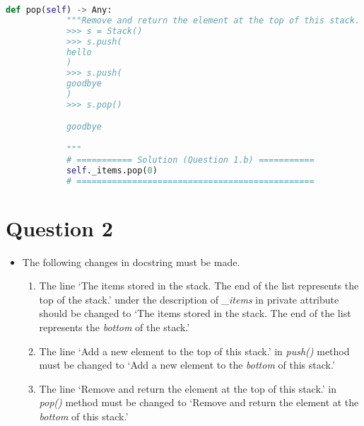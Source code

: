\documentclass[12pt]{article}
\begin{document}
\begin{enumerate}[a.]
\begin{lstlisting}[language=Python,caption={worksheet\_10\_q1b\_solution.py},captionpos=b]
        def pop(self) -> Any:
            """Remove and return the element at the top of this stack.
            >>> s = Stack()
            >>> s.push(
            hello
            )
            >>> s.push(
            goodbye
            )
            >>> s.pop()

            goodbye

            """
            # =========== Solution (Question 1.b) ===========
            self._items.pop(0)
            # ===============================================
    \end{lstlisting}

\end{enumerate}

\section*{Question 2}
\begin{itemize}
    \item

    The following changes in docstring must be made.

    \begin{enumerate}[1.]
        \item The line `The items stored in the stack. The end of the list represents the top of the stack.'
        under the description of \textit{\_items} in private attribute should be changed to
        `The items stored in the stack. The end of the list represents the \textit{bottom} of the stack.'

        \item The line `Add a new element to the top of this stack.' in \textit{push()}
        method must be changed to `Add a new element to the \textit{bottom} of this stack.'
        \item The line `Remove and return the element at the top of this stack.'
        in \textit{pop()} method must be changed to `Remove and return the
        element at the \textit{bottom} of this stack.'
    \end{enumerate}
\end{itemize}

\bigskip
\end{document}
